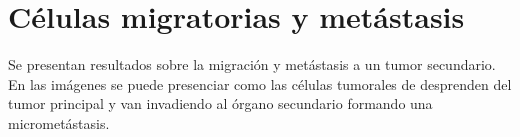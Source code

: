 
\section*{C\'elulas migratorias y met\'astasis}

Se presentan resultados sobre la migración y met\'astasis a un tumor secundario. En las im\'agenes se puede presenciar como las c\'elulas tumorales de desprenden del tumor principal y van invadiendo al \'organo secundario formando una micrometástasis.

\begin{figure}[p]
    \begin{center}
    

\end{center}
\end{figure}
